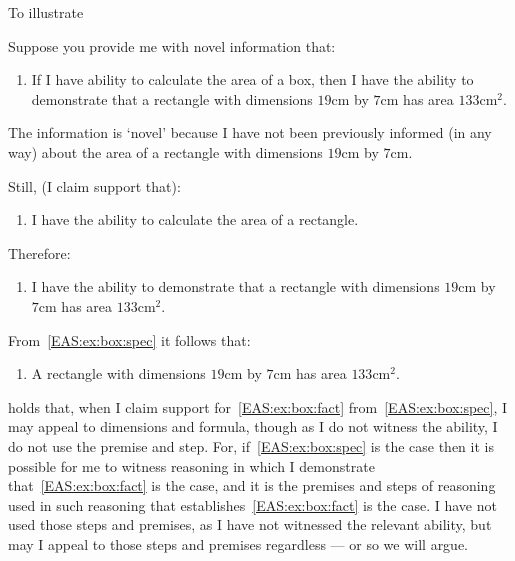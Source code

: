 \begin{note}
  To illustrate \EAS{}

  \begin{illustration}\label{ill:rectangle:ability}
    Suppose you provide me with novel information that:
    \begin{enumerate}[label=\emph{A}\arabic*., ref=(\emph{A}\arabic*), series=EAS_counter]
    \item\label{EAS:ex:box:if} If I have ability to calculate the area of a box, then I have the ability to demonstrate that a rectangle with dimensions \(19\text{cm}\) by \(7\text{cm}\) has area \(133\text{cm}^{2}\).
    \end{enumerate}
    The information is `novel' because I have not been previously informed (in any way) about the area of a rectangle with dimensions \(19\text{cm}\) by \(7\text{cm}\).

    Still, (I claim support that):
    \begin{enumerate}[label=\emph{A}\arabic*., ref=(\emph{A}\arabic*), resume*=EAS_counter]
    \item\label{EAS:ex:box:gen} I have the ability to calculate the area of a rectangle.
    \end{enumerate}
    Therefore:
    \begin{enumerate}[label=\emph{A}\arabic*., ref=(\emph{A}\arabic*), resume*=EAS_counter]
    \item\label{EAS:ex:box:spec} I have the ability to demonstrate that a rectangle with dimensions \(19\text{cm}\) by \(7\text{cm}\) has area \(133\text{cm}^{2}\).
    \end{enumerate}
    From~\ref{EAS:ex:box:spec} it follows that:
    \begin{enumerate}[label=\emph{A}\arabic*., ref=(\emph{A}\arabic*), resume*=EAS_counter]
    \item\label{EAS:ex:box:fact} A rectangle with dimensions \(19\text{cm}\) by \(7\text{cm}\) has area \(133\text{cm}^{2}\).
    \end{enumerate}
  \end{illustration}
  \EAS{} holds that, when I claim support for~\ref{EAS:ex:box:fact} from~\ref{EAS:ex:box:spec}, I may appeal to dimensions and formula, though as I do not witness the ability, I do not use the premise and step.
  For, if~\ref{EAS:ex:box:spec} is the case then it is possible for me to witness reasoning in which I demonstrate that~\ref{EAS:ex:box:fact} is the case, and it is the premises and steps of reasoning used in such reasoning that establishes~\ref{EAS:ex:box:fact} is the case.
  I have not used those steps and premises, as I have not witnessed the relevant ability, but may I appeal to those steps and premises regardless --- or so we will argue.
\end{note}

